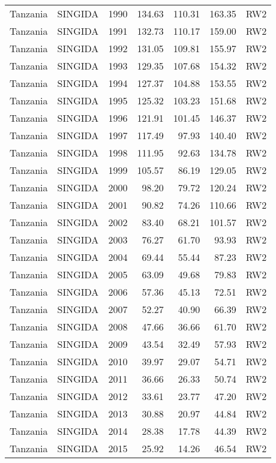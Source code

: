 \begin{longtable}{lllrrrl}
  Tanzania & SINGIDA & 1990 & 134.63 & 110.31 & 163.35 & RW2 \\ 
  Tanzania & SINGIDA & 1991 & 132.73 & 110.17 & 159.00 & RW2 \\ 
  Tanzania & SINGIDA & 1992 & 131.05 & 109.81 & 155.97 & RW2 \\ 
  Tanzania & SINGIDA & 1993 & 129.35 & 107.68 & 154.32 & RW2 \\ 
  Tanzania & SINGIDA & 1994 & 127.37 & 104.88 & 153.55 & RW2 \\ 
  Tanzania & SINGIDA & 1995 & 125.32 & 103.23 & 151.68 & RW2 \\ 
  Tanzania & SINGIDA & 1996 & 121.91 & 101.45 & 146.37 & RW2 \\ 
  Tanzania & SINGIDA & 1997 & 117.49 & 97.93 & 140.40 & RW2 \\ 
  Tanzania & SINGIDA & 1998 & 111.95 & 92.63 & 134.78 & RW2 \\ 
  Tanzania & SINGIDA & 1999 & 105.57 & 86.19 & 129.05 & RW2 \\ 
  Tanzania & SINGIDA & 2000 & 98.20 & 79.72 & 120.24 & RW2 \\ 
  Tanzania & SINGIDA & 2001 & 90.82 & 74.26 & 110.66 & RW2 \\ 
  Tanzania & SINGIDA & 2002 & 83.40 & 68.21 & 101.57 & RW2 \\ 
  Tanzania & SINGIDA & 2003 & 76.27 & 61.70 & 93.93 & RW2 \\ 
  Tanzania & SINGIDA & 2004 & 69.44 & 55.44 & 87.23 & RW2 \\ 
  Tanzania & SINGIDA & 2005 & 63.09 & 49.68 & 79.83 & RW2 \\ 
  Tanzania & SINGIDA & 2006 & 57.36 & 45.13 & 72.51 & RW2 \\ 
  Tanzania & SINGIDA & 2007 & 52.27 & 40.90 & 66.39 & RW2 \\ 
  Tanzania & SINGIDA & 2008 & 47.66 & 36.66 & 61.70 & RW2 \\ 
  Tanzania & SINGIDA & 2009 & 43.54 & 32.49 & 57.93 & RW2 \\ 
  Tanzania & SINGIDA & 2010 & 39.97 & 29.07 & 54.71 & RW2 \\ 
  Tanzania & SINGIDA & 2011 & 36.66 & 26.33 & 50.74 & RW2 \\ 
  Tanzania & SINGIDA & 2012 & 33.61 & 23.77 & 47.20 & RW2 \\ 
  Tanzania & SINGIDA & 2013 & 30.88 & 20.97 & 44.84 & RW2 \\ 
  Tanzania & SINGIDA & 2014 & 28.38 & 17.78 & 44.39 & RW2 \\ 
  Tanzania & SINGIDA & 2015 & 25.92 & 14.26 & 46.54 & RW2 \\ 

\end{longtable}
